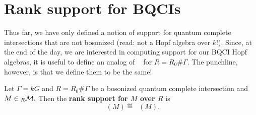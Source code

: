 \documentclass [11pt, proquest] {uwthesis}[2020/02/24]
\DeclareMathOperator{\suppr}{supp^\mathit{rnk}}
\DeclareMathOperator{\supprR}{supp^\mathit{rnk}_R}
\DeclareMathOperator{\supprRnaught}{supp^\mathit{rnk}_{R_0}}
\begin{document}
\section{Rank support for BQCIs}
    Thus far, we have only defined a notion of support for quantum complete intersections that are not bosonized (read: not a Hopf algebra over $k$!). Since, at the end of the day, we are interested in computing support for our BQCI Hopf algebras, it is useful to define an analog of $\suppr$ for $R=R_0\#\Gamma$. The punchline, however, is that we define them to be the same!
    
    \begin{defn}\label{def:bosonized-rank-supp}
        Let $\Gamma=kG$ and $R=R_0\#\Gamma$ be a bosonized quantum complete intersection and $M\in{_R\mathcal{M}}.$ Then the \textbf{rank support for $M$ over $R$} is
        \[\supprR(M)\eqdef\supprRnaught(M).\]
    \end{defn}
    
    
    
        
\end{document}
